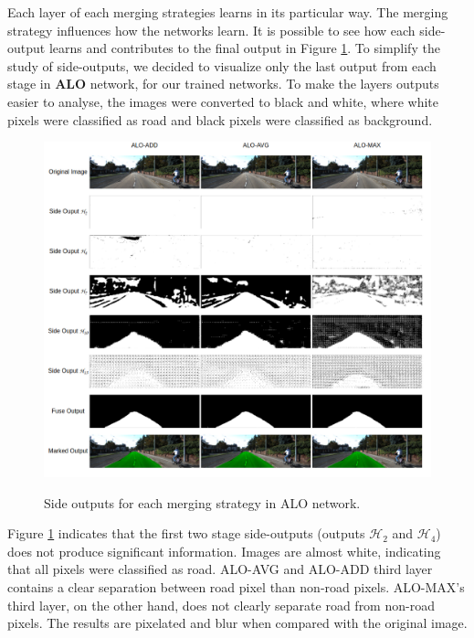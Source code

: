 Each layer of each merging strategies learns in its particular way. The merging strategy influences how the networks learn. It is possible to see how each side-output learns and contributes to the final output in Figure \ref{fig:side_outputs}. To simplify the study of side-outputs, we decided to visualize only the last  output from each stage in \textbf{ALO} network, for our trained networks. To make the layers outputs easier to analyse, the images were  converted to black and white, where white pixels were classified as road and black pixels were classified as background.


\begin{figure}
  \caption{Side outputs for each merging strategy in ALO network.}
  \centering
  \includegraphics[width=1.0\textwidth]{figures/falreis/side_outputs.png}
  \label{fig:side_outputs}
\end{figure}


Figure \ref{fig:side_outputs} indicates that the first two stage side-outputs (outputs $\mathcal{H}_2$ and $\mathcal{H}_4$) does not produce significant information. Images are almost white, indicating that all pixels were classified as road. ALO-AVG and ALO-ADD third layer contains a clear separation between road pixel than non-road pixels. ALO-MAX's third layer, on the other hand, does not clearly separate road from non-road pixels. The results are pixelated and blur when compared with the original image.

